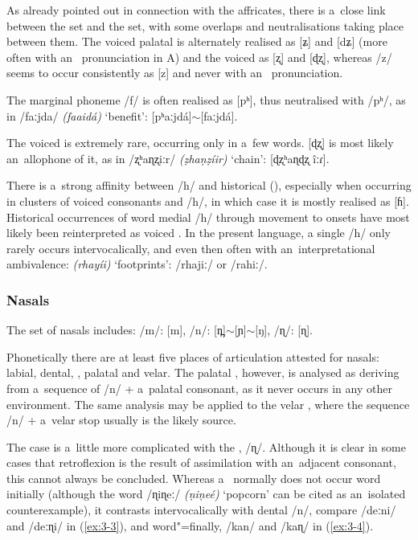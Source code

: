 As already pointed out in connection with the affricates, there is a~close link between the  set and the  set, with some overlaps and neutralisations taking place between them. The voiced palatal  is alternately realised as [ʑ] and [dʑ] (more often with an~ pronunciation in A) and the voiced  as [ʐ] and [ɖʐ], whereas /z/ seems to occur consistently as [z] and never with an~ pronunciation.


The marginal phoneme /f/ is often realised as [pʰ], thus neutralised with /pʰ/, as in /faːjda/ \textit{(faaidá)} `benefit': [pʰaːjdá]$\sim$[faːjdá].


The voiced   is extremely rare, occurring only in a~few words. [ɖʐ] is most likely an~allophone of it, as in /ʐʰaɳʐiːr/ \textit{(ẓhaṇẓíir)} `chain': [ɖʐʰaɳɖʐ îːɾ]. 


There is a~strong affinity between /h/ and historical  (), especially when occurring in clusters of voiced consonants and /h/, in which case it is mostly realised as [ɦ]. Historical occurrences of word medial /h/ through movement to  onsets have most likely been reinterpreted as voiced . In the present language, a single /h/ only rarely occurs intervocalically, and even then often with an~interpretational ambivalence: \textit{(rhayíi)} `footprints': /rhajiː/ or /rahiː/.


\subsubsection*{Nasals}

The set of nasals includes: /m/: [m], /n/: [n̪]$\sim${}[ɲ]$\sim$[ŋ], /ɳ/: [ɳ].


Phonetically there are at least five places of articulation attested for nasals: labial, dental, , palatal and velar. The palatal , however, is analysed as deriving from a~sequence of /n/ + a~palatal consonant, as it never occurs in any other environment. The same analysis may be applied to the velar , where the sequence /n/ + a~velar stop usually is the likely source.


The case is a~little more complicated with the  , /ɳ/. Although it is clear in some cases that retroflexion is the result of assimilation with an~adjacent  consonant, this cannot always be concluded. Whereas a~  normally does not occur word initially (although the word /ɳiɳeː/ \textit{(ṇiṇeé)} `popcorn' can be cited as an~isolated counterexample), it contrasts intervocalically with dental /n/, compare /deːni/ and /deːɳi/ in (\ref{ex:3-3}), and word"=finally, /kan/ and /kaɳ/ in (\ref{ex:3-4}). 

